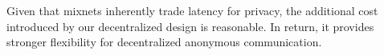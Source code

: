 Given that mixnets inherently trade latency for privacy, the additional cost introduced by our decentralized design is reasonable.  
In return, it provides stronger flexibility for decentralized anonymous communication.







